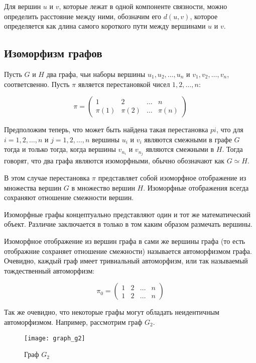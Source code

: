 \documentclass{article}
\begin{document}
Для вершин $u$ и $v$, которые лежат в одной компоненте связности, можно определить расстояние между ними, обозначим его $d(u, v)$, которое определяется как длина самого короткого пути между вершинами $u$ и $v$.

\newpage

\subsection{Изоморфизм графов}

Пусть $G$ и $H$ два графа, чьи наборы вершины $u_1, u_2, \dots, u_n$ и $v_1, v_2, \dots, v_n$, соответсвенно. Пусть $\pi$ является перестановкой чисел $1, 2, \dots, n$:

$$
\pi = 
\left(\begin{array}{cccc}
1 & 2 & \dots & n \\
\pi(1) & \pi(2) & \dots & \pi(n)
\end{array}\right)
$$

Предположим теперь, что может быть найдена такая перестановка $pi$, что для $i = 1, 2, \dots, n$ и $j = 1, 2, \dots, n$ вершины $u_i$ и $v_i$ являются смежными в графе $G$ тогда и только тогда, когда вершины $v_{n_i}$ и $v_{n_j}$ являются смежными в $H$. Тогда говорят, что два графа являются изоморфными, обычно обозначают как $G \simeq H$. 

В этом случае перестановка $\pi$ представляет собой изоморфное отображение из множества вершин $G$ в множество вершин $H$. Изоморфные отображения всегда сохраняют отношение смежности вершин.

Изоморфные графы концептуально представляют один и тот же математический объект. Различие заключается в только в том каким образом размечать вершины.

Изоморфное отображение из вершин графа в сами же вершины графа (то есть отображние сохраняет отношение смежности) называется автоморфизмом графа. Очевидно, каждый граф имеет тривиальный автоморфизм, или так называемый тождественный автоморфизм:

$$
\pi_0 = 
\left(\begin{array}{cccc}
1 & 2 & \dots & n \\
1 & 2 & \dots & n
\end{array}\right)
$$

Так же очевидно, что некоторые графы могут обладать неидентичным автоморфизмом. Например, рассмотрим граф $G_2$.

\begin{figure}[h]
\texttt{[image: graph\_g2]}
\centering
\caption{Граф $G_2$}
\end{figure}
\end{document}
